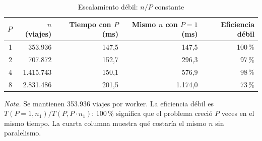 \begin{table}[H]
\caption{Escalamiento débil: $n/P$ constante}\label{tab:debil}
\small
\begin{tabular}{@{}rrrrr@{}}
\toprule
\textbf{$P$} & \textbf{$n$ (viajes)} & \textbf{Tiempo con $P$ (ms)} & \textbf{Mismo $n$ con $P=1$ (ms)} & \textbf{Eficiencia débil} \\
\midrule
1 & 353.936 & 147,5 & 147,5 & 100\,\% \\
2 & 707.872 & 152,7 & 296,3 & 97\,\% \\
4 & 1.415.743 & 150,1 & 576,9 & 98\,\% \\
8 & 2.831.486 & 201,5 & 1.174,0 & 73\,\% \\
\bottomrule
\end{tabular}

{\footnotesize\textit{Nota.} Se mantienen 353.936 viajes por worker. La eficiencia débil es $T(P{=}1, n_1) / T(P, P \cdot n_1)$: 100\,\% significa que el problema creció $P$ veces en el mismo tiempo. La cuarta columna muestra qué costaría el mismo $n$ sin paralelismo.\par}
\end{table}
